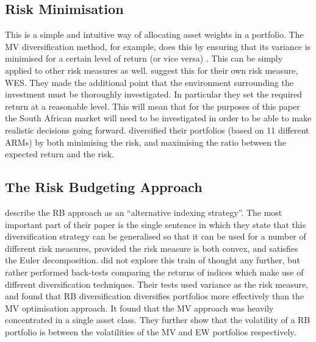 \documentclass[12pt,a4paper]{article}
\begin{document}
\subsection{Risk Minimisation}
\label{subsec:Riskmin} 

This is a simple and intuitive way of allocating asset weights in a portfolio. The MV diversification method, for example, does this by ensuring that its variance is minimised for a certain level of return (or vice versa) \citep{markowitz1952portfolio}. This can be simply applied to other risk measures as well. \cite{CHEN20111777} suggest this for their own risk measure, WES. They made the additional point that the environment surrounding the investment must be thoroughly investigated. In particular they set the required return at a reasonable level. This will mean that for the purposes of this paper the South African market will need to be investigated in order to be able to make realistic decisions going forward. \cite{righi2017simulation} diversified their portfolios (based on 11 different ARMs) by both minimising the risk, and maximising the ratio between the expected return and the risk.

\subsection{The Risk Budgeting Approach}
\label{subsec:RB} 

\cite{bruder2012managing} describe the RB approach as an ``alternative indexing strategy''. The most important part of their paper is the single sentence in which they state that this diversification strategy can be generalised so that it can be used for a number of different risk measures, provided the risk measure is both convex, and satisfies the Euler decomposition. \cite{bruder2012managing} did not explore this train of thought any further, but rather performed back-tests comparing the returns of indices which make use of different diversification techniques. Their tests used variance as the risk measure, and found that RB diversification diversifies portfolios more effectively than the MV optimisation approach. It found that the MV approach was heavily concentrated in a single asset class. They further show that the volatility of a RB portfolio is between the volatilities of the MV and EW portfolios respectively.
\end{document}

